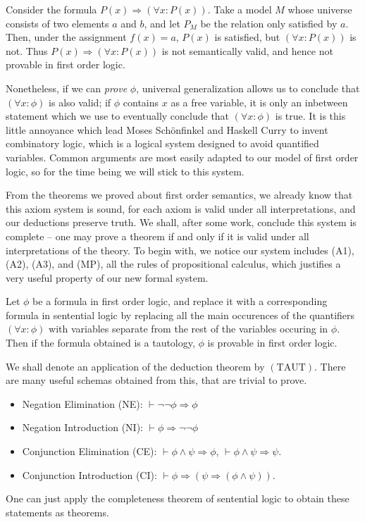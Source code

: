 \begin{example}
    Consider the formula $P(x) \Rightarrow (\forall x: P(x))$. Take a model $M$ whose universe consists of two elements $a$ and $b$, and let $P_M$ be the relation only satisfied by $a$. Then, under the assignment $f(x) = a$, $P(x)$ is satisfied, but $(\forall x: P(x))$ is not. Thus $P(x) \Rightarrow (\forall x: P(x))$ is not semantically valid, and hence not provable in first order logic.
\end{example}

Nonetheless, if we can {\it prove} $\phi$, universal generalization allows us to conclude that $(\forall x: \phi)$ is also valid; if $\phi$ contains $x$ as a free variable, it is only an inbetween statement which we use to eventually conclude that $(\forall x: \phi)$ is true. It is this little annoyance which lead Moses Sch\"{o}nfinkel and Haskell Curry to invent combinatory logic, which is a logical system designed to avoid quantified variables. Common arguments are most easily adapted to our model of first order logic, so for the time being we will stick to this system.

From the theorems we proved about first order semantics, we already know that this axiom system is sound, for each axiom is valid under all interpretations, and our deductions preserve truth. We shall, after some work, conclude this system is complete -- one may prove a theorem if and only if it is valid under all interpretations of the theory. To begin with, we notice our system includes (A1), (A2), (A3), and (MP), all the rules of propositional calculus, which justifies a very useful property of our new formal system.

\begin{theorem}
    Let $\phi$ be a formula in first order logic, and replace it with a corresponding formula in sentential logic by replacing all the main occurences of the quantifiers $(\forall x: \phi)$ with variables separate from the rest of the variables occuring in $\phi$. Then if the formula obtained is a tautology, $\phi$ is provable in first order logic.
\end{theorem}

We shall denote an application of the deduction theorem by $(\text{TAUT})$. There are many useful schemas obtained from this, that are trivial to prove.
%
\begin{itemize}
    \item Negation Elimination (NE): $\vdash \neg \neg \phi \Rightarrow \phi$
    \item Negation Introduction (NI): $\vdash \phi \Rightarrow \neg \neg \phi$
    \item Conjunction Elimination (CE): $\vdash \phi \wedge \psi \Rightarrow \phi$, $\vdash \phi \wedge \psi \Rightarrow \psi$.
    \item Conjunction Introduction (CI): $\vdash \phi \Rightarrow (\psi \Rightarrow (\phi \wedge \psi))$.
\end{itemize}
%
One can just apply the completeness theorem of sentential logic to obtain these statements as theorems.

